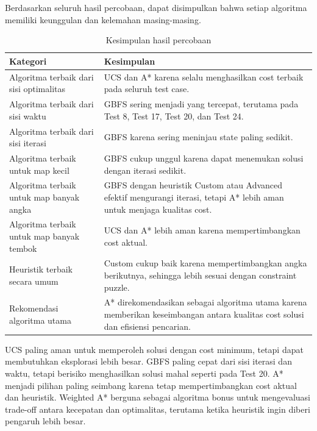 Berdasarkan seluruh hasil percobaan, dapat disimpulkan bahwa setiap algoritma memiliki keunggulan dan kelemahan masing-masing.

\begin{table}[H]
	\centering
	\caption{Kesimpulan hasil percobaan}
	\begin{tabular}{|p{5cm}|p{9cm}|}
		\hline
		\rowcolor{green!15}
		\textbf{Kategori} & \textbf{Kesimpulan} \\
		\hline
		Algoritma terbaik dari sisi optimalitas & UCS dan A* karena selalu menghasilkan cost terbaik pada seluruh test case. \\
		\hline
		Algoritma terbaik dari sisi waktu & GBFS sering menjadi yang tercepat, terutama pada Test 8, Test 17, Test 20, dan Test 24. \\
		\hline
		Algoritma terbaik dari sisi iterasi & GBFS karena sering meninjau state paling sedikit. \\
		\hline
		Algoritma terbaik untuk map kecil & GBFS cukup unggul karena dapat menemukan solusi dengan iterasi sedikit. \\
		\hline
		Algoritma terbaik untuk map banyak angka & GBFS dengan heuristik Custom atau Advanced efektif mengurangi iterasi, tetapi A* lebih aman untuk menjaga kualitas cost. \\
		\hline
		Algoritma terbaik untuk map banyak tembok & UCS dan A* lebih aman karena mempertimbangkan cost aktual. \\
		\hline
		Heuristik terbaik secara umum & Custom cukup baik karena mempertimbangkan angka berikutnya, sehingga lebih sesuai dengan constraint puzzle. \\
		\hline
		Rekomendasi algoritma utama & A* direkomendasikan sebagai algoritma utama karena memberikan keseimbangan antara kualitas cost solusi dan efisiensi pencarian. \\
		\hline
	\end{tabular}
\end{table}

\begin{tcolorbox}[
	colback=green!5,
	colframe=green!50!black,
	title=\textbf{Kesimpulan Akhir},
	arc=2mm,
	boxrule=0.8pt
]
UCS paling aman untuk memperoleh solusi dengan cost minimum, tetapi dapat membutuhkan eksplorasi lebih besar. 
GBFS paling cepat dari sisi iterasi dan waktu, tetapi berisiko menghasilkan solusi mahal seperti pada Test 20. 
A* menjadi pilihan paling seimbang karena tetap mempertimbangkan cost aktual dan heuristik. 
Weighted A* berguna sebagai algoritma bonus untuk mengevaluasi trade-off antara kecepatan dan optimalitas, terutama ketika heuristik ingin diberi pengaruh lebih besar.
\end{tcolorbox}